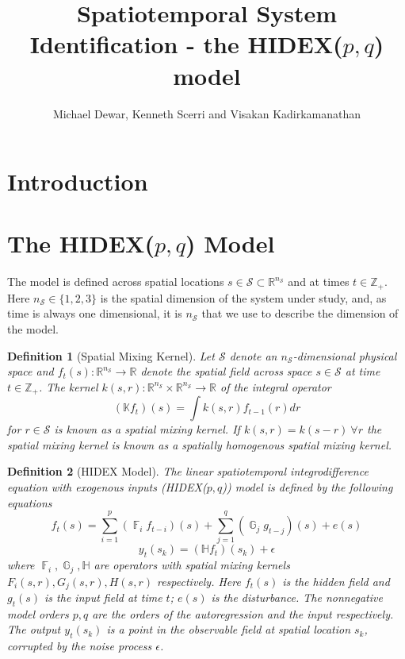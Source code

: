 \documentclass{IEEEtran}
\title{Spatiotemporal System Identification - the HIDEX($p,q$) model}
\author{Michael Dewar, Kenneth Scerri and Visakan Kadirkamanathan}
\DeclareMathOperator{\F}{\mathbb{F}}
\DeclareMathOperator{\G}{\mathbb{G}}
\DeclareMathOperator{\onto}{\rightarrow}
\newtheorem{definition}{Definition}
\begin{document}
\maketitle

\section{Introduction}

\section{The HIDEX($p,q$) Model}
\label{sec:model}

The model is defined across spatial locations $s \in \mathcal{S} \subset \mathbb{R}^{n_\mathcal{S}}$ and at times $t \in \mathbb{Z}_+$. Here $n_\mathcal{S} \in \{1,2,3\}$ is the spatial dimension of the system under study, and, as time is always one dimensional, it is $n_\mathcal{S}$ that we use to describe the dimension of the model. 

\begin{definition}[Spatial Mixing Kernel]
	Let $\mathcal{S}$ denote an $n_\mathcal{S}$-dimensional physical space and $f_t(s): \mathbb{R}^{n_\mathcal{S}} \onto \mathbb{R}$ denote the spatial field across space $s \in \mathcal{S}$ at time $t \in \mathbb{Z}_+$. The kernel $k(s,r): \mathbb{R}^{n_\mathcal{S}} \times \mathbb{R}^{n_\mathcal{S}} \onto \mathbb{R}$ of the integral operator
	\begin{equation}
		(\mathbb{K}f_t)(s) = \int k(s,r) f_{t-1}(r) dr
	\end{equation}
	for $r \in \mathcal{S}$ is known as a \emph{spatial mixing kernel}. If $k(s,r) = k(s-r) ~ \forall r$ the spatial mixing kernel is known as a \emph{spatially homogenous spatial mixing kernel}.
\end{definition}

\begin{definition}[HIDEX Model]
	\label{def:hidex}
	The linear spatiotemporal integrodifference equation with exogenous inputs (HIDEX($p,q$)) model is defined by the following equations
	\begin{equation}
		\label{eqn:hidex-hidden}
	f_t(s)= \sum_{i=1}^{p} (\F_i f_{t-i})(s) + \sum_{j=1}^{q}(\G_j g_{t-j})(s)+e(s)
	\end{equation}
	\begin{equation}
	\label{eqn:hidex-obs}
	y_t(s_k) = (\mathbb{H}f_t)(s_k) + \epsilon
	\end{equation}
	where $\F_i,\G_j,\mathbb{H}$ are operators with spatial mixing kernels $F_i(s,r), G_j(s,r), H(s,r)$ respectively. Here $f_t(s)$ is the hidden field and $g_{t}(s)$ is the input field at time $t$; $e(s)$ is the disturbance. The nonnegative model orders $p,q$ are the orders of the autoregression and the input respectively. The output $y_t(s_k)$ is a point in the observable field at spatial location $s_k$, corrupted by the noise process $\epsilon$.
\end{definition}
\end{document}
